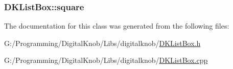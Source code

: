 \hypertarget{class_d_k_list_box_acac57a4ff43952d752bb7f7bc03df46c}{
\subsubsection[{square}]{ D\-K\-List\-Box\-::square}}\label{class_d_k_list_box_acac57a4ff43952d752bb7f7bc03df46c}


The documentation for this class was generated from the following files\-:\begin{DoxyCompactItemize}
\item 
G\-:/\-Programming/\-Digital\-Knob/\-Libs/digitalknob/\hyperlink{_d_k_list_box_8h}{D\-K\-List\-Box.\-h}\item 
G\-:/\-Programming/\-Digital\-Knob/\-Libs/digitalknob/\hyperlink{_d_k_list_box_8cpp}{D\-K\-List\-Box.\-cpp}\end{DoxyCompactItemize}
